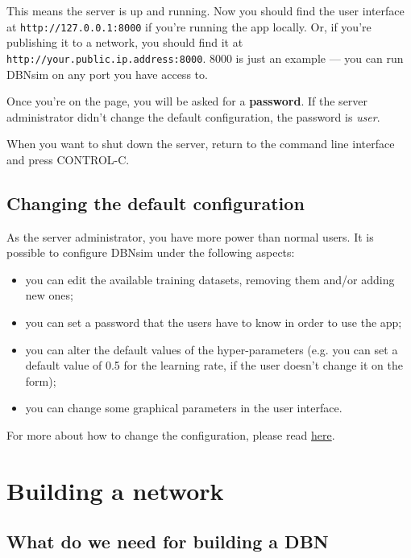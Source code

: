 \documentclass[a4paper]{article}
\begin{document}
		
This means the server is up and running. Now you should find the user interface at \texttt{http://127.0.0.1:8000} if you're running the app locally. Or, if you're publishing it to a network, you should find it at \texttt{http://your.public.ip.address:8000}. 8000 is just an example --- you can run DBNsim on any port you have access to.
		
Once you're on the page, you will be asked for a \textbf{password}. If the server administrator didn't change the default configuration, the password is \emph{user}.
		
When you want to shut down the server, return to the command line interface and press CONTROL-C.

		
	\subsection{Changing the default configuration}

		
As the server administrator, you have more power than normal users. It is possible to configure DBNsim under the following aspects:
		
	\begin{itemize}
		
			
	\item you can edit the available training datasets, removing them and/or adding new ones;
			
	\item you can set a password that the users have to know in order to use the app;
			
	\item you can alter the default values of the hyper-parameters (e.g. you can set a default value of 0.5 for the learning rate, if the user doesn't change it on the form);
			
	\item you can change some graphical parameters in the user interface.
		
	\end{itemize}

		
For more about how to change the configuration, please read \href{05\_admin.html}{here}.
	


		
	\section{Building a network}


		
	\subsection{What do we need for building a DBN}
\end{document}
